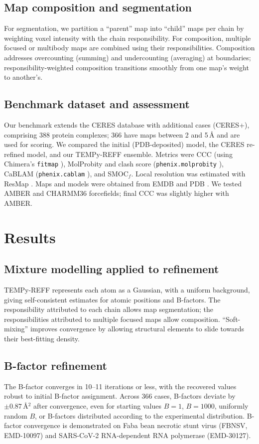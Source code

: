 \documentclass[11pt]{article}
\begin{document}
\subsection{Map composition and segmentation}
For segmentation, we partition a ``parent'' map into ``child'' maps per chain by weighting voxel intensity with the chain responsibility. For composition, multiple focused or multibody maps are combined using their responsibilities. Composition addresses overcounting (summing) and undercounting (averaging) at boundaries; responsibility-weighted composition transitions smoothly from one map's weight to another's.

\subsection{Benchmark dataset and assessment}
Our benchmark extends the CERES database \citep{r29} with additional cases (CERES+), comprising 388 protein complexes; 366 have maps between 2 and 5\,\AA{} and are used for scoring. We compared the initial (PDB-deposited) model, the CERES re-refined model, and our TEMPy-REFF ensemble. Metrics were CCC (using Chimera's \texttt{fitmap} \citep{r39,r46}), MolProbity and clash score (\texttt{phenix.molprobity} \citep{r34}), CaBLAM (\texttt{phenix.cablam} \citep{r35,r56}), and SMOC$_f$. Local resolution was estimated with ResMap \citep{r49}. Maps and models were obtained from EMDB \citep{r54} and PDB \citep{r55}. We tested AMBER \citep{r17} and CHARMM36 \citep{r16} forcefields; final CCC was slightly higher with AMBER.

\section{Results}
\subsection{Mixture modelling applied to refinement}
TEMPy-REFF represents each atom as a Gaussian, with a uniform background, giving self-consistent estimates for atomic positions and B-factors. The responsibility attributed to each chain allows map segmentation; the responsibilities attributed to multiple focused maps allow composition. ``Soft-mixing'' improves convergence by allowing structural elements to slide towards their best-fitting density.

\subsection{B-factor refinement}
The B-factor converges in 10--11 iterations or less, with the recovered values robust to initial B-factor assignment. Across 366 cases, B-factors deviate by $\pm 0.87$\,\AA$^2$ after convergence, even for starting values $B=1$, $B=1000$, uniformly random $B$, or B-factors distributed according to the experimental distribution. B-factor convergence is demonstrated on Faba bean necrotic stunt virus (FBNSV, EMD-10097) and SARS-CoV-2 RNA-dependent RNA polymerase (EMD-30127).
\end{document}

